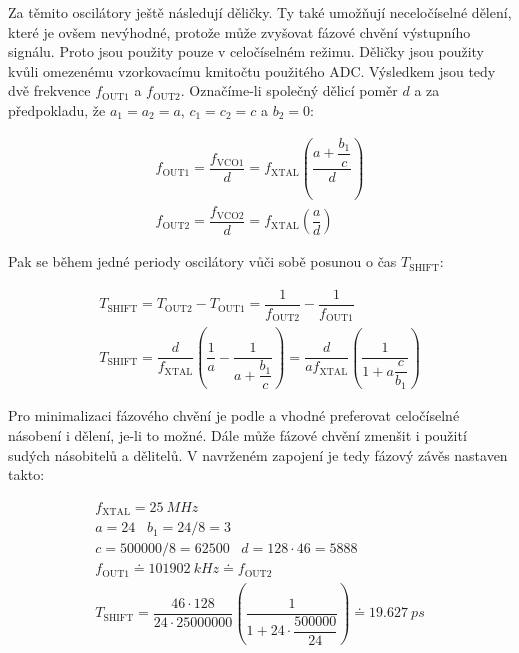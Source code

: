Za těmito oscilátory ještě následují děličky. Ty také umožňují neceločíselné dělení, které je ovšem nevýhodné, protože může zvyšovat fázové chvění výstupního signálu. Proto jsou použity pouze v celočíselném režimu. Děličky jsou použity kvůli omezenému vzorkovacímu kmitočtu použitého \acrshort{ADC}. Výsledkem jsou tedy dvě frekvence $f_\mathrm{OUT1}$ a $f_\mathrm{OUT2}$. Označíme-li společný dělicí poměr $d$ a za předpokladu, že $a_1=a_2=a$, $c_1=c_2=c$ a $b_2=0$:

\begin{equation}
\begin{gathered}
f_\mathrm{OUT1}=\dfrac{f_\mathrm{VCO1}}{d}=f_\mathrm{XTAL} \left(\dfrac{a+\dfrac{b_1}{c} }{d}\right) \\
f_\mathrm{OUT2}=\dfrac{f_\mathrm{VCO2}}{d}=f_\mathrm{XTAL} \left(\dfrac{a}{d}\right)
\end{gathered}
\end{equation}

Pak se během jedné periody oscilátory vůči sobě posunou o čas $T_\textrm{SHIFT}$:

\begin{equation}
\begin{gathered}
T_\mathrm{SHIFT}=T_\mathrm{OUT2}-T_\mathrm{OUT1}=\dfrac{1}{f_\mathrm{OUT2}} - \dfrac{1}{f_\mathrm{OUT1}} \\
T_\mathrm{SHIFT}=\dfrac{d}{f_\mathrm{XTAL}} \left(\dfrac{1}{a} - \dfrac{1}{a+\dfrac{b_1}{c}}\right) = \dfrac{d}{a f_\mathrm{XTAL}} \left(\dfrac{1}{1+a\dfrac{c}{b_1}}\right)
\end{gathered}
\label{equation_tshift}
\end{equation}

Pro minimalizaci fázového chvění je podle \cite{Si5351datasheet} a \cite{Si5351applicationnote} vhodné preferovat celočíselné násobení i dělení, je-li to možné. Dále může fázové chvění zmenšit i použití sudých násobitelů a dělitelů. V navrženém zapojení je tedy fázový závěs nastaven takto:

\begin{equation}
\begin{gathered}
f_\mathrm{XTAL}=\SI{25}{MHz} \\
a=24 \;\;\; b_1=24/8=3 \\
c=500000/8=62500 \;\;\; d=128 \cdot 46=5888 \\
f_\mathrm{OUT1} \doteq \SI{101902}{kHz} \doteq f_\mathrm{OUT2} \\
T_\mathrm{SHIFT} = \dfrac{46 \cdot 128}{24 \cdot 25000000} \left(\dfrac{1}{1+24 \cdot \dfrac{500000}{24}}\right) \doteq \SI{19.627}{ps}
\end{gathered}
\end{equation}

